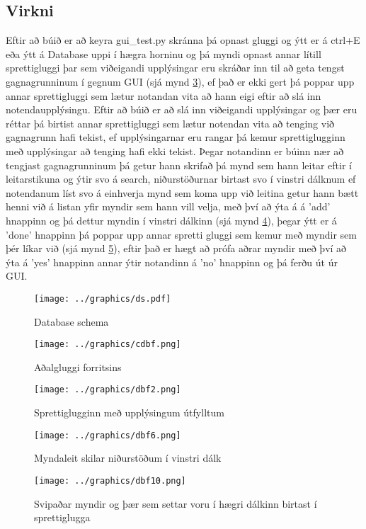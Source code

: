 \documentclass[12pt, git, draft]{rureport}
\begin{document}
\subsection {Virkni}
Eftir að búið er að keyra gui\_test.py skránna þá opnast gluggi og ýtt er á ctrl+E eða ýtt á Database uppi í hægra horninu og þá myndi opnast annar lítill sprettigluggi þar sem viðeigandi upplýsingar eru skráðar inn til að geta tengst gagnagrunninum í gegnum GUI (sjá mynd \ref{fig:dbf2}), ef það er ekki gert þá poppar upp annar sprettigluggi sem lætur notandan vita að hann eigi eftir að slá inn notendaupplýsingu.
\newline
\newline
Eftir að búið er að slá inn viðeigandi upplýsingar og þær eru réttar þá birtist annar sprettigluggi sem lætur notendan vita að tenging við gagnagrunn hafi tekist, ef upplýsingarnar eru rangar þá kemur sprettiglugginn með upplýsingar að tenging hafi ekki tekist.
\newline
\newline
Þegar notandinn er búinn nær að tengjast gagnagrunninum þá getur hann skrifað þá mynd sem hann leitar eftir í leitarstikuna og ýtir svo á search, niðurstöðurnar birtast svo í vinstri dálknum ef notendanum líst svo á einhverja mynd sem koma upp við leitina  getur hann bætt henni við á listan yfir myndir sem hann vill velja, með því að ýta á á 'add' hnappinn og þá dettur myndin í vinstri dálkinn (sjá mynd \ref{fig:dbf6}), þegar ýtt er á 'done' hnappinn þá poppar upp annar spretti gluggi sem kemur með myndir sem þér líkar við (sjá mynd \ref{fig:dbf10}), eftir það er hægt að prófa aðrar myndir með því að ýta á 'yes' hnappinn annar ýtir notandinn á 'no' hnappinn og þá ferðu út úr GUI.

\pagebreak
\begin{figure}
	\centering 
	\texttt{[image: ../graphics/ds.pdf]}
	\caption{Database schema \label{fig:dataschema}}
\end{figure}

\begin{figure}
	\centering 
	\texttt{[image: ../graphics/cdbf.png]}
	\caption{Aðalgluggi forritsins \label{fig:cdbf}}
\end{figure}

\begin{figure}
	\centering 
	\texttt{[image: ../graphics/dbf2.png]}
	\caption{ Sprettiglugginn með upplýsingum útfylltum \label{fig:dbf2}}
\end{figure}


\begin{figure}
	\centering 
	\texttt{[image: ../graphics/dbf6.png]}
	\caption{Myndaleit skilar niðurstöðum í vinstri dálk\label{fig:dbf6}}
\end{figure}

\begin{figure}
	\centering 
	\texttt{[image: ../graphics/dbf10.png]}
	\caption{Svipaðar myndir og þær sem settar voru í hægri dálkinn birtast í sprettiglugga\label{fig:dbf10}}
\end{figure}

\clearpage
\printbibliography
\end{document}
